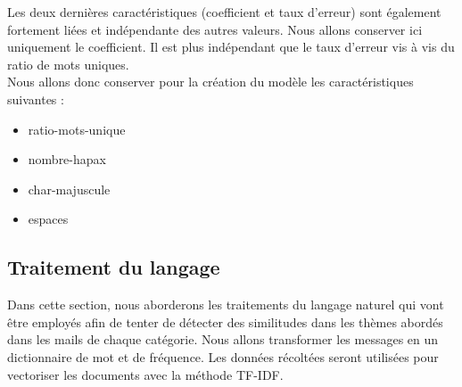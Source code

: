             Les deux dernières caractéristiques (coefficient et taux d'erreur) sont également fortement liées et indépendante des autres valeurs.
            Nous allons conserver ici uniquement le coefficient.
            Il est plus indépendant que le taux d'erreur vis à vis du ratio de mots uniques.\\

            Nous allons donc conserver pour la création du modèle les caractéristiques suivantes :
            \begin{itemize}
                \item ratio-mots-unique
                \item nombre-hapax
                \item char-majuscule
                \item espaces
            \end{itemize}

\subsection{Traitement du langage}
    Dans cette section, nous aborderons les traitements du langage naturel qui vont être employés afin de tenter de
    détecter des similitudes dans les thèmes abordés dans les mails de chaque catégorie.
    Nous allons transformer les messages en un dictionnaire de mot et de fréquence.
    Les données récoltées seront utilisées pour vectoriser les documents avec la méthode TF-IDF\@.

